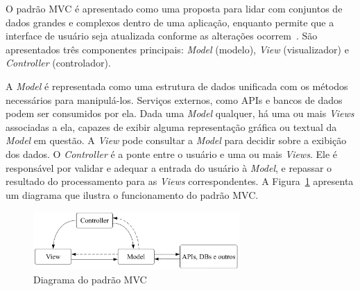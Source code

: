 O padrão MVC é apresentado como uma proposta para lidar com conjuntos de dados grandes e complexos dentro de uma aplicação, enquanto permite que a interface de usuário seja atualizada conforme as alterações ocorrem~\cite{mvc-paper}.
São apresentados três componentes principais: \emph{Model} (modelo), \emph{View} (visualizador) e \emph{Controller} (controlador).

A \emph{Model} é representada como uma estrutura de dados unificada com os métodos necessários para manipulá-los.
Serviços externos, como APIs e bancos de dados podem ser consumidos por ela.
Dada uma \emph{Model} qualquer, há uma ou mais \emph{Views} associadas a ela, capazes de exibir alguma representação gráfica ou textual da \emph{Model} em questão.
A \emph{View} pode consultar a \emph{Model} para decidir sobre a exibição dos dados.
O \emph{Controller} é a ponte entre o usuário e uma ou mais \emph{Views}.
Ele é responsável por validar e adequar a entrada do usuário à \emph{Model}, e repassar o resultado do processamento para as \emph{Views} correspondentes.
A Figura~\ref{fig:mvc} apresenta um diagrama que ilustra o funcionamento do padrão MVC.

\begin{figure}[ht]
	\centering
	\includegraphics[width=0.7\textwidth]{images/mvc.png}
	\caption{Diagrama do padrão MVC}
	\label{fig:mvc}
\end{figure}